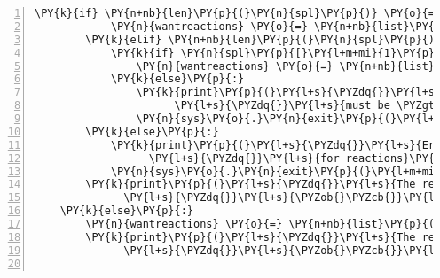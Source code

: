 \begin{Verbatim}[commandchars=\\\{\},fontsize=\small,numbers=left,firstnumber=1,stepnumber=2,firstline=2]
        \PY{k}{if} \PY{n+nb}{len}\PY{p}{(}\PY{n}{spl}\PY{p}{)} \PY{o}{==} \PY{l+m+mi}{2}\PY{p}{:}
            \PY{n}{wantreactions} \PY{o}{=} \PY{n+nb}{list}\PY{p}{(}\PY{n+nb}{range}\PY{p}{(}\PY{n}{spl}\PY{p}{[}\PY{l+m+mi}{0}\PY{p}{]}\PY{p}{,} \PY{n}{spl}\PY{p}{[}\PY{l+m+mi}{1}\PY{p}{]} \PY{o}{+} \PY{l+m+mi}{1}\PY{p}{)}\PY{p}{)}
        \PY{k}{elif} \PY{n+nb}{len}\PY{p}{(}\PY{n}{spl}\PY{p}{)} \PY{o}{==} \PY{l+m+mi}{3}\PY{p}{:}
            \PY{k}{if} \PY{n}{spl}\PY{p}{[}\PY{l+m+mi}{1}\PY{p}{]} \PY{o}{\PYZgt{}}\PY{o}{=} \PY{l+m+mi}{1}\PY{p}{:}
                \PY{n}{wantreactions} \PY{o}{=} \PY{n+nb}{list}\PY{p}{(}\PY{n+nb}{range}\PY{p}{(}\PY{n}{spl}\PY{p}{[}\PY{l+m+mi}{0}\PY{p}{]}\PY{p}{,} \PY{n}{spl}\PY{p}{[}\PY{l+m+mi}{2}\PY{p}{]} \PY{o}{+} \PY{l+m+mi}{1}\PY{p}{,} \PY{n}{spl}\PY{p}{[}\PY{l+m+mi}{1}\PY{p}{]}\PY{p}{)}\PY{p}{)}
            \PY{k}{else}\PY{p}{:}
                \PY{k}{print}\PY{p}{(}\PY{l+s}{\PYZdq{}}\PY{l+s}{Error: the interval in the reactions specification }\PY{l+s}{\PYZdq{}}
                      \PY{l+s}{\PYZdq{}}\PY{l+s}{must be \PYZgt{}= 1}\PY{l+s}{\PYZdq{}}\PY{p}{)}
                \PY{n}{sys}\PY{o}{.}\PY{n}{exit}\PY{p}{(}\PY{l+m+mi}{1}\PY{p}{)}
        \PY{k}{else}\PY{p}{:}
            \PY{k}{print}\PY{p}{(}\PY{l+s}{\PYZdq{}}\PY{l+s}{Error: Specify either start:stop or start:interval:stop }\PY{l+s}{\PYZdq{}}
                  \PY{l+s}{\PYZdq{}}\PY{l+s}{for reactions}\PY{l+s}{\PYZdq{}}\PY{p}{)}
            \PY{n}{sys}\PY{o}{.}\PY{n}{exit}\PY{p}{(}\PY{l+m+mi}{1}\PY{p}{)}
        \PY{k}{print}\PY{p}{(}\PY{l+s}{\PYZdq{}}\PY{l+s}{The reactions considered in these analyses are }\PY{l+s}{\PYZdq{}}
              \PY{l+s}{\PYZdq{}}\PY{l+s}{\PYZob{}\PYZcb{}}\PY{l+s}{\PYZdq{}}\PY{o}{.}\PY{n}{format}\PY{p}{(}\PY{n}{wantreactions}\PY{p}{)}\PY{p}{)}
    \PY{k}{else}\PY{p}{:}
        \PY{n}{wantreactions} \PY{o}{=} \PY{n+nb}{list}\PY{p}{(}\PY{n+nb}{int}\PY{p}{(}\PY{n}{wantrxns}\PY{p}{)}\PY{p}{)}
        \PY{k}{print}\PY{p}{(}\PY{l+s}{\PYZdq{}}\PY{l+s}{The reaction considered in these analyses is }\PY{l+s}{\PYZdq{}}
              \PY{l+s}{\PYZdq{}}\PY{l+s}{\PYZob{}\PYZcb{}}\PY{l+s}{\PYZdq{}}\PY{o}{.}\PY{n}{format}\PY{p}{(}\PY{n}{wantreactions}\PY{p}{)}\PY{p}{)}


\end{Verbatim}
